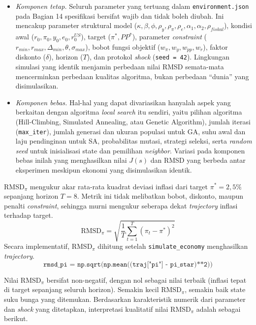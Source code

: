 \begin{itemize}
    \item \textit{Komponen tetap.} Seluruh parameter yang tertuang dalam \texttt{environment.json} pada Bagian 14 spesifikasi bersifat wajib dan tidak boleh diubah. Ini mencakup parameter struktural model ($\kappa, \beta, \phi, \rho_y, \rho_\pi, \rho_e, \alpha_1, \alpha_2, \rho_{fiskal}$), kondisi awal ($r_0, \pi_0, y_0, e_0, r_0^{US}$), target ($\pi^{*}, PP^{*}$), parameter \textit{constraint} ($r_{min}, r_{max}, \Delta_{min}, \theta, \sigma_{max}$), bobot fungsi objektif ($w_\pi, w_y, w_{pp}, w_r$), faktor diskonto ($\delta$), horizon ($T$), dan protokol \textit{shock} (\texttt{seed = 42}). Lingkungan simulasi yang identik menjamin perbedaan nilai RMSD semata-mata mencerminkan perbedaan kualitas algoritma, bukan perbedaan ``dunia'' yang disimulasikan.
    \item \textit{Komponen bebas.} Hal-hal yang dapat divariasikan hanyalah aspek yang berkaitan dengan algoritma \textit{local search} itu sendiri, yaitu pilihan algoritma (Hill-Climbing, Simulated Annealing, atau Genetic Algorithm), jumlah iterasi (\texttt{max\_iter}), jumlah generasi dan ukuran populasi untuk GA, suhu awal dan laju pendinginan untuk SA, probabilitas mutasi, strategi seleksi, serta \textit{random seed} untuk inisialisasi state dan pemilihan \textit{neighbor}. Variasi pada komponen bebas inilah yang menghasilkan nilai $J(s)$ dan RMSD yang berbeda antar eksperimen meskipun ekonomi yang disimulasikan identik.
\end{itemize}
RMSD$_{\pi}$ mengukur akar rata-rata kuadrat deviasi inflasi dari target $\pi^{*} = 2{,}5\%$ sepanjang horizon $T = 8$. Metrik ini tidak melibatkan bobot, diskonto, maupun penalti \textit{constraint}, sehingga murni mengukur seberapa dekat \textit{trajectory} inflasi terhadap target.
\[
    \text{RMSD}_{\pi} = \sqrt{\frac{1}{T} \sum_{t=1}^{T} (\pi_t - \pi^{*})^{2}}
\]
Secara implementatif, RMSD$_{\pi}$ dihitung setelah \texttt{simulate\_economy} menghasilkan \textit{trajectory}.
\[
    \texttt{rmsd\_pi = np.sqrt(np.mean((traj["pi"] - pi\_star)**2))}
\]

Nilai RMSD$_{\pi}$ bersifat non-negatif, dengan nol sebagai nilai terbaik (inflasi tepat di target sepanjang seluruh horizon). Semakin kecil RMSD$_{\pi}$, semakin baik state suku bunga yang ditemukan. Berdasarkan karakteristik numerik dari parameter dan \textit{shock} yang ditetapkan, interpretasi kualitatif nilai RMSD$_{\pi}$ adalah sebagai berikut.

